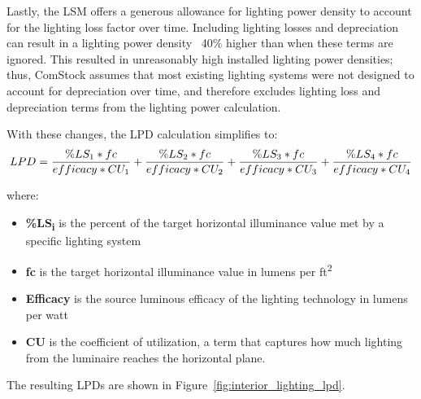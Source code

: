 Lastly, the LSM offers a generous allowance for lighting power density to account for the lighting loss factor over time. Including lighting losses and depreciation can result in a lighting power density ~40\% higher than when these terms are ignored. This resulted in unreasonably high installed lighting power densities; thus, ComStock assumes that most existing lighting systems were not designed to account for depreciation over time, and therefore excludes lighting loss and depreciation terms from the lighting power calculation.

With these changes, the LPD calculation simplifies to:
\begin{align}
\label{comstock_lpd_eqn}
LPD = {\% LS_{1} * fc \over efficacy * CU_{1}} + {\% LS_{2} * fc \over efficacy * CU_{2}} + {\% LS_{3} * fc \over efficacy * CU_{3}} + {\% LS_{4} * fc \over efficacy * CU_{4}}
\end{align}

where:\\
\begin{itemize}
\item \textbf{\%LS\textsubscript{i}} is the percent of the target horizontal illuminance value met by a specific lighting system\\
\item \textbf{fc} is the target horizontal illuminance value in lumens per ft\textsuperscript{2}\\
\item \textbf{Efficacy} is the source luminous efficacy of the lighting technology in lumens per watt\\
\item \textbf{CU} is the coefficient of utilization, a term that captures how much lighting from the luminaire reaches the horizontal plane.\\
\end{itemize}

The resulting LPDs are shown in Figure~\ref{fig:interior_lighting_lpd}.




